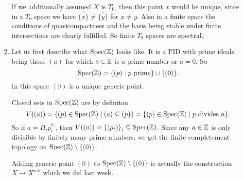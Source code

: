\begin{exercise}{1}
\begin{enumerate}
{            If we additionally assumed $X$ is $T_0$, then this point $x$ would
            be unique, since in a $T_0$ space we have $\overline{\{x\}} \not=
            \overline{\{y\}}$ for $x \not= y$. Also in a finite space the
            conditions of quasicompactness and the basis being stable under
            finite intersections are clearly fulfilled. So finite $T_0$ spaces
            are spectral.
            }
        \item{
                Let us first describe what $\operatorname{Spec}(\mathbb{Z})$ looks like. It is a PID
                with prime ideals being those $(a)$ for which $a \in \mathbb{Z}$ is a
                prime number or $a = 0$. So
                \begin{equation*}
                    \operatorname{Spec}(\mathbb{Z}) = \{ (p) \mid p\ \text{prime} \} \cup \{ (0) \}.
                \end{equation*}
                In this space $(0)$ is a unique generic point.

                Closed sets in $\operatorname{Spec}(\mathbb{Z})$ are by definiton
                \begin{equation*}
                    V((a)) = \{ (p) \in \operatorname{Spec}(\mathbb{Z}) \mid (a) \subseteq (p) \} = 
                    \{ (p) \in \operatorname{Spec}(\mathbb{Z}) \mid p\ \text{divides}\ a \}.
                \end{equation*}
                So if $a = \Pi_{i} p^{k_i}_i$, then $V((a)) = {\{ (p_i) \}}_i
                \subseteq \operatorname{Spec}(\mathbb{Z})$. Since any $a \in \mathbb{Z}$ is only divisible by
                finitely many prime numbers, we get the finite completement
                topology on $\operatorname{Spec}(\mathbb{Z}) \setminus \{(0)\}$.

                Adding generic point $(0)$ to $\operatorname{Spec}(\mathbb{Z}) \setminus \{(0)\}$ is
                actually the construction $X \rightarrow X^{\text{sob}}$ which
                we did last week.




}
\end{enumerate}
\end{exercise}
